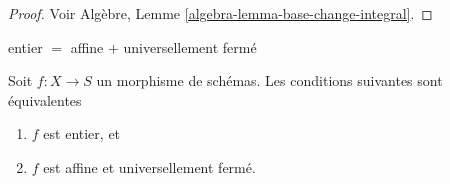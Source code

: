\begin{proof}
Voir Algèbre, Lemme \ref{algebra-lemma-base-change-integral}.
\end{proof}

\begin{lemma}
\label{lemma-integral-universally-closed}
\begin{slogan}
entier $=$ affine $+$ universellement fermé
\end{slogan}
Soit $f : X \to S$ un morphisme de schémas. Les conditions
suivantes sont équivalentes
\begin{enumerate}
\item $f$ est entier, et
\item $f$ est affine et universellement fermé.
\end{enumerate}
\end{lemma}

